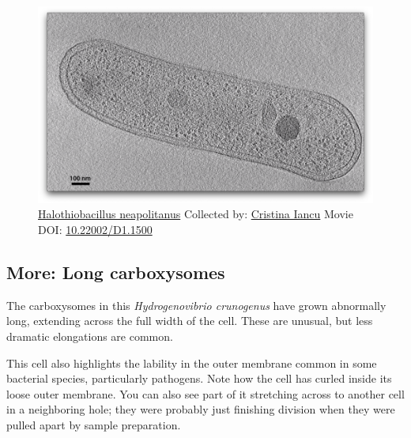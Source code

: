 \documentclass[]{tufte-book}
\begin{document}
\begin{figure}
\includegraphics{movie_stills/4_7a} \caption[\protect\hyperlink{tree}{Halothiobacillus neapolitanus}
Collected by: \protect\hyperlink{cristina_iancu}{Cristina Iancu} Movie
DOI: \href{https://doi.org/10.22002/D1.1500}{10.22002/D1.1500}]{\protect\hyperlink{tree}{Halothiobacillus neapolitanus}
Collected by: \protect\hyperlink{cristina_iancu}{Cristina Iancu} Movie
DOI: \href{https://doi.org/10.22002/D1.1500}{10.22002/D1.1500}}\label{fig:4-7a}
\end{figure}

\hypertarget{Long_carboxysomes}{\subsection*{More: Long
carboxysomes}\label{Long_carboxysomes}}

The carboxysomes in this \emph{Hydrogenovibrio crunogenus} have grown
abnormally long, extending across the full width of the cell. These are
unusual, but less dramatic elongations are common.

This cell also highlights the lability in the outer membrane common in
some bacterial species, particularly pathogens. Note how the cell has
curled inside its loose outer membrane. You can also see part of it
stretching across to another cell in a neighboring hole; they were
probably just finishing division when they were pulled apart by sample
preparation.
\end{document}

